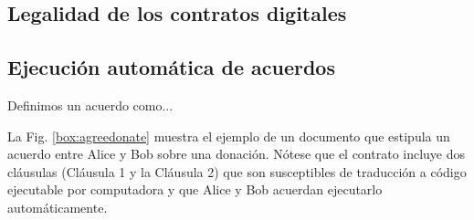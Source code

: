 \documentclass[12pt]{report} %
\begin{document}
\subsection{Legalidad de los contratos digitales}
\label{legalitydigitalcont}

\subsection{Ejecución automática de acuerdos}

Definimos un acuerdo como...

La Fig. \ref{box:agreedonate}  muestra el ejemplo de un documento que estipula un acuerdo entre Alice y Bob sobre una donación. Nótese que el contrato incluye dos cláusulas (Cláusula 1 y la Cláusula 2) que son susceptibles de traducción a código ejecutable por computadora y que Alice y Bob acuerdan ejecutarlo automáticamente.
\end{document}
